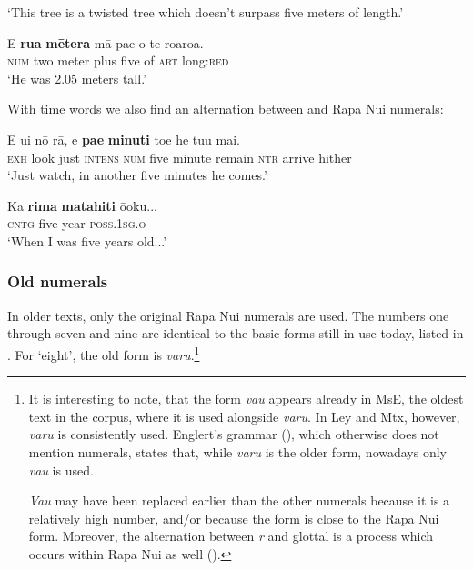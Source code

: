 \glt 
‘This tree is a twisted tree which doesn’t surpass five meters of length.’ \textstyleExampleref{[R478.055]} 
\z

\ea\label{ex:4.20}
\gll E \textbf{rua} \textbf{mētera} mā pae o te roaroa. \\
\textsc{num} two meter plus five of \textsc{art} long:\textsc{red} \\

\glt
‘He was 2.05 meters tall.’ \textstyleExampleref{[R250.177]} 
\z

With time words we also find an alternation between  and Rapa Nui numerals:

\ea\label{ex:4.21}
\gll E u{\ꞌ}i nō rā, e \textbf{pae} \textbf{minuti} toe he tu{\ꞌ}u mai. \\
\textsc{exh} look just \textsc{intens} \textsc{num} five minute remain \textsc{ntr} arrive hither \\

\glt 
‘Just watch, in another five minutes he comes.’ \textstyleExampleref{[R437.037]} 
\z

\ea\label{ex:4.22}
\gll Ka \textbf{rima} \textbf{matahiti} ō{\ꞌ}oku...\\
\textsc{cntg} five year \textsc{poss.1sg.o}\\

\glt 
‘When I was five years old...’ \textstyleExampleref{[R242.001]} 
\z

\subsubsection[Old numerals]{Old numerals}\label{sec:4.3.1.2}

In older texts, only the original Rapa Nui numerals are used. The numbers one through seven and nine are identical to the basic forms still in use today, listed in . For ‘eight’, the old form is \textit{varu}.\footnote{\label{fn:172}It is interesting to note, that the  form \textit{va{\ꞌ}u} appears already in MsE, the oldest text in the corpus, where it is used alongside \textit{varu}. In Ley and Mtx, however, \textit{varu} is consistently used. Englert’s grammar (\citealt[58]{Englert1978}), which otherwise does not mention  numerals, states that, while \textit{varu} is the older form, nowadays only \textit{va{\ꞌ}u} is used. 

\textit{Va{\ꞌ}u} may have been replaced earlier than the other numerals because it is a relatively high number, and/or because the  form is close to the Rapa Nui form. Moreover, the alternation between \textit{r} and glottal is a process which occurs within Rapa Nui as well ().} 


